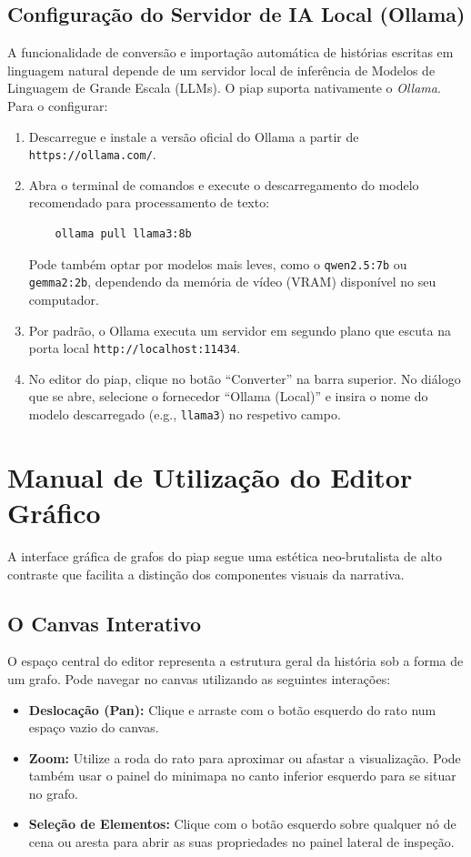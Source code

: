 \subsection{Configuração do Servidor de IA Local (Ollama)}
A funcionalidade de conversão e importação automática de histórias escritas em linguagem natural depende de um servidor local de inferência de Modelos de Linguagem de Grande Escala (LLMs). O \gls{piap} suporta nativamente o \textit{Ollama}. Para o configurar:
\begin{enumerate}
    \item Descarregue e instale a versão oficial do Ollama a partir de \texttt{https://ollama.com/}.
    \item Abra o terminal de comandos e execute o descarregamento do modelo recomendado para processamento de texto:
    \begin{verbatim}
    ollama pull llama3:8b
    \end{verbatim}
    Pode também optar por modelos mais leves, como o \texttt{qwen2.5:7b} ou \texttt{gemma2:2b}, dependendo da memória de vídeo (VRAM) disponível no seu computador.
    \item Por padrão, o Ollama executa um servidor em segundo plano que escuta na porta local \texttt{http://localhost:11434}.
    \item No editor do \gls{piap}, clique no botão ``Converter'' na barra superior. No diálogo que se abre, selecione o fornecedor ``Ollama (Local)'' e insira o nome do modelo descarregado (e.g., \texttt{llama3}) no respetivo campo.
\end{enumerate}

\section{Manual de Utilização do Editor Gráfico}
A interface gráfica de grafos do \gls{piap} segue uma estética neo-brutalista de alto contraste que facilita a distinção dos componentes visuais da narrativa.

\subsection{O Canvas Interativo}
O espaço central do editor representa a estrutura geral da história sob a forma de um grafo. Pode navegar no canvas utilizando as seguintes interações:
\begin{itemize}
    \item \textbf{Deslocação (Pan):} Clique e arraste com o botão esquerdo do rato num espaço vazio do canvas.
    \item \textbf{Zoom:} Utilize a roda do rato para aproximar ou afastar a visualização. Pode também usar o painel do minimapa no canto inferior esquerdo para se situar no grafo.
    \item \textbf{Seleção de Elementos:} Clique com o botão esquerdo sobre qualquer nó de cena ou aresta para abrir as suas propriedades no painel lateral de inspeção.
\end{itemize}

